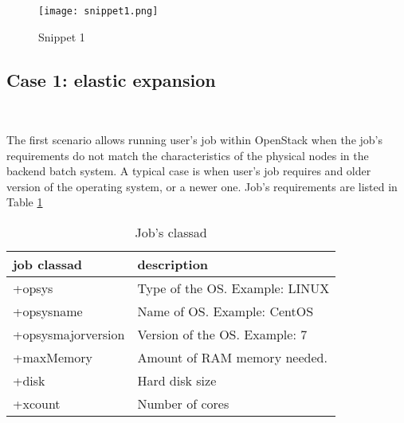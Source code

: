 \documentclass[a4paper]{jpconf}
\begin{document}

\begin{figure}[h]
    \centering
    \texttt{[image: snippet1.png]}
    \caption{Snippet 1}
    \label{fig:snippet1}
\end{figure}


\subsection{Case 1: elastic expansion}

~

The first scenario allows running user's job within OpenStack when
the job's requirements do not match the characteristics of the physical nodes in
the backend batch system.
A typical case is when user's job requires and older version of the operating
system, or a newer one.
Job's requirements are listed in Table \ref{table:classad1}


\begin{table}[h]
\centering
\begin{tabular}{ l l }
  \hline
  \textbf{job classad} & \textbf{description} \\
  \hline
  +opsys & Type of the OS. Example: LINUX  \\
  +opsysname & Name of OS. Example: CentOS \\
  +opsysmajorversion & Version of the OS. Example: 7 \\
  +maxMemory & Amount of RAM memory needed. \\
  +disk & Hard disk size \\
  +xcount & Number of cores \\
  \hline
\end{tabular}
\caption{Job's classad}
\label{table:classad1}
\end{table}
\end{document}
